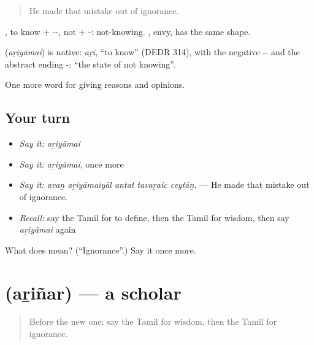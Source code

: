 \begin{quote}
He made that mistake out of ignorance.
\end{quote}

, to know + --, not + -: not-knowing. , envy, has the same shape.

\begin{cousinweb}
\textbf{} (\emph{aṟiyāmai}) is native: \emph{aṟi}, \textquotedblleft{}to know\textquotedblright{} (DEDR 314), with the negative -- and the abstract ending -: \textquotedblleft{}the state of not knowing\textquotedblright{}.
\end{cousinweb}

\begin{grammarlens}[title={What you've built}]
One more word for giving reasons and opinions.
\end{grammarlens}

\subsection*{Your turn}
\begin{itemize}
\raggedright
  \item \emph{Say it:} \emph{aṟiyāmai}
  \item \emph{Say it:} \emph{aṟiyāmai}, once more
  \item \emph{Say it:} \emph{avaṉ aṟiyāmaiyāl antat tavaṟaic ceytāṉ.} — He made that mistake out of ignorance.
  \item \emph{Recall:} say the Tamil for to define, then the Tamil for wisdom, then say \emph{aṟiyāmai} again
\end{itemize}

\begin{tcolorbox}[breakable,colback=teal!4,colframe=teal!35!black,title={Before you move on}]
What does  mean? (\textquotedblleft{}Ignorance\textquotedblright{}.) Say it once more.
\end{tcolorbox}
\section[\texorpdfstring{\ta{அறிஞர்} (aṟiñar)}{அறிஞர் (aṟiñar)}]{ (aṟiñar) — a scholar}

\label{lesson:TA-C367-arinar}



\begin{quote}
Before the new one: say the Tamil for wisdom, then the Tamil for ignorance.
\end{quote}

